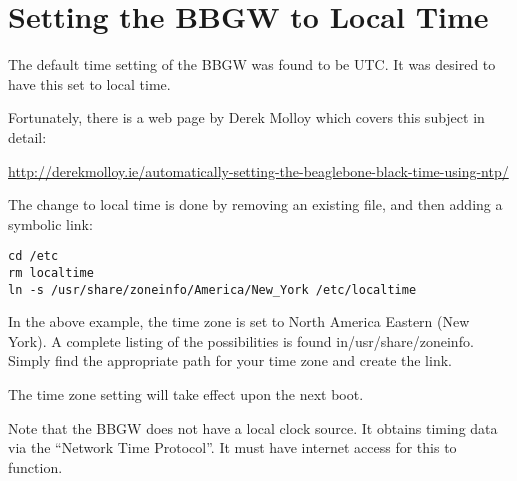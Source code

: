 \chapter{Setting the BBGW to Local Time}

The default time setting of the BBGW was found to be UTC.  It was desired to 
have this set to local time.

Fortunately, there is a web page by Derek Molloy which covers this subject in 
detail:

\url{http://derekmolloy.ie/automatically-setting-the-beaglebone-black-time-using-ntp/}

The change to local time is done by removing an existing file, and then adding 
a symbolic link:

\begin{verbatim}
cd /etc
rm localtime
ln -s /usr/share/zoneinfo/America/New_York /etc/localtime
\end{verbatim}

In the above example, the time zone is set to North America Eastern (New 
York).  A complete listing of the possibilities is found in/usr/share/zoneinfo.
Simply find the appropriate path for your time zone and create the link.

The time zone setting will take effect upon the next boot.

Note that the BBGW does not have a local clock source.  It obtains timing data 
via the ``Network Time Protocol''.  It must have internet access for this to 
function.
